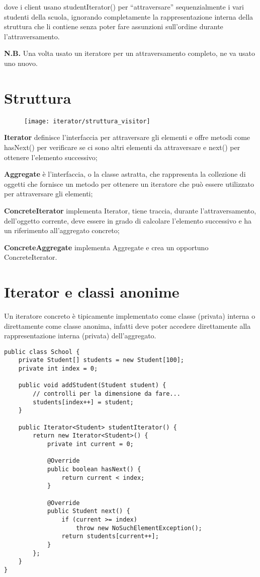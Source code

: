 dove i client usano studentIterator() per “attraversare” sequenzialmente i vari studenti della scuola, ignorando completamente la rappresentazione interna della 
struttura che li contiene senza poter fare assunzioni sull’ordine durante l’attraversamento.

\medskip
\textbf{N.B.} Una volta usato un iteratore per un attraversamento completo, ne va usato uno nuovo.

\section{Struttura}

\begin{figure}[H]
    \centering
    \texttt{[image: iterator/struttura\_visitor]}
\end{figure}

\textbf{Iterator} definisce l'interfaccia per attraversare gli elementi e offre metodi come hasNext() per verificare se ci sono altri elementi da attraversare e next()
per ottenere l'elemento successivo;

\textbf{Aggregate} è l'interfaccia, o la classe astratta, che rappresenta la collezione di oggetti che fornisce un metodo per ottenere un iteratore che può essere 
utilizzato per attraversare gli elementi;

\textbf{ConcreteIterator} implementa Iterator, tiene traccia, durante l’attraversamento, dell’oggetto corrente, deve essere in grado di calcolare l’elemento 
successivo e ha un riferimento all’aggregato concreto;

\textbf{ConcreteAggregate} implementa Aggregate e crea un opportuno ConcreteIterator.

\section{Iterator e classi anonime}

Un iteratore concreto è tipicamente implementato come classe (privata) interna o direttamente come classe anonima, infatti deve poter accedere direttamente alla
rappresentazione interna (privata) dell’aggregato.
\begin{lstlisting}
public class School {
    private Student[] students = new Student[100];
    private int index = 0;
    
    public void addStudent(Student student) {
        // controlli per la dimensione da fare...
        students[index++] = student;
    }

    public Iterator<Student> studentIterator() {
        return new Iterator<Student>() {
            private int current = 0;

            @Override
            public boolean hasNext() {
                return current < index;
            }

            @Override
            public Student next() {
                if (current >= index)
                    throw new NoSuchElementException();
                return students[current++];
            }
        };
    }
}
\end{lstlisting}

